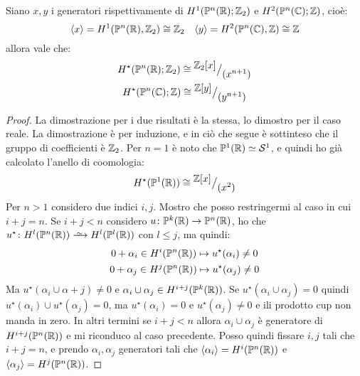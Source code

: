 \begin{theorem}
  Siano $ x, y $ i generatori rispettivamente di $ H^1(\mathbb{P}^{n} (\mathbb{R}); \mathbb{Z}_2) $ e $ H^2(\mathbb{P}^{n} (\mathbb{C}); \mathbb{Z}) $,
  cioè:
  \[
    \langle x \rangle = H^1(\mathbb{P}^{n} (\mathbb{R}), \mathbb{Z}_2) \cong \mathbb{Z}_2 \quad \langle y \rangle = H^2(\mathbb{P}^{n} (\mathbb{C}), \mathbb{Z}) \cong \mathbb{Z}
  \]
  allora vale che:
  \begin{gather*}
    H^\star(\mathbb{P}^{n} (\mathbb{R}); \mathbb{Z}_2) \cong {^{\textstyle \mathbb{Z}_2[x]}\big/_{\textstyle (x^{n+1})}} \\
    H^\star(\mathbb{P}^{n} (\mathbb{C}); \mathbb{Z}) \cong {^{\textstyle \mathbb{Z}[y]}\big/_{\textstyle (y^{n+1})}}
  \end{gather*}
\end{theorem}
\begin{proof}
  La dimostrazione per i due risultati è la stessa, lo dimostro per il caso
  reale. La dimostrazione è per induzione, e in ciò che segue è sottinteso che
  il gruppo di coefficienti è $ \mathbb{Z}_2 $.
  Per $ n = 1 $ è noto che $ \mathbb{P}^{1} (\mathbb{R}) \simeq \mathcal{S}^{1} $, e quindi ho già calcolato
  l'anello di coomologia:
  \[
    H^\star(\mathbb{P}^{1} (\mathbb{R})) \cong {^{\textstyle \mathbb{Z}[x]}\big/_{\textstyle (x^2)}}
  \]
  Per $ n > 1 $ considero due indici $ i, j $. Mostro che posso restringermi al
  caso in cui $ i + j = n $. Se $ i + j < n $ considero
  $ u \colon \mathbb{P}^{k} (\mathbb{R}) \to \mathbb{P}^{n} (\mathbb{R}) $, ho che $ u^\star \colon H^l(\Pjr{n}) \homoto H^l(\Pjr{l}) $
  con $ l \leq j $, ma quindi:
  \begin{gather*}
    0 + \alpha_i \in H^i(\mathbb{P}^{n} (\mathbb{R})) \mapsto u^\star(\alpha_i) \not = 0 \\
    0 + \alpha_j \in H^j(\mathbb{P}^{n} (\mathbb{R})) \mapsto u^\star(\alpha_j) \not = 0
  \end{gather*}
  Ma $ u^\star(\alpha_i \cup \alpha+j) \not = 0 $ e $ \alpha_i \cup \alpha_j \in H^{i+j}(\mathbb{P}^{k} (\mathbb{R})) $. Se $
  u^\star(\alpha_i \cup \alpha_j) = 0 $ quindi $ u^\star(\alpha_i) \cup u^\star(\alpha_j) = 0 $, ma $ u^\star(\alpha_i) = 0 $
  e $ u^\star(\alpha_j) \not = 0 $ e ili prodotto cup non manda in zero. In altri termini
  se $ i + j < n $ allora $ \alpha_i \cup \alpha_j $ è generatore di $ H^{i+j}(\mathbb{P}^{n} (\mathbb{R})) $ e
  mi riconduco al caso precedente. Posso quindi fissare $ i, j $ tali che $ i +
  j = n $, e prendo $ \alpha_i, \alpha_j $ generatori tali che $ \langle\alpha_i\rangle = H^i(\mathbb{P}^{n} (\mathbb{R})) $ e
  $ \langle\alpha_j\rangle = H^j(\mathbb{P}^{n} (\mathbb{R})) $.


\end{proof}
